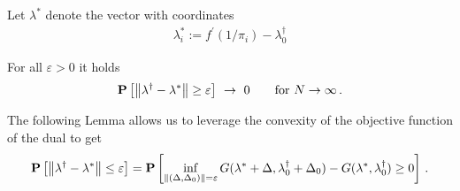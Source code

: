 Let $\lambda^*$ denote the vector with coordinates
\begin{gather}
  \lambda^*_i
  :=
  f^{'}(1/\pi_i)
  -
  \lambda^\dagger_0
\end{gather}

\begin{theorem}
  \label{bw:cd:th}
  For all
  $\varepsilon>0$ it holds
  \begin{gather}
    \P
    \left[ 
    \norm{
      \lambda^\dagger
      -
      \lambda^*
    }
    \ge
    \varepsilon
    \right]
    \ 
    \to
    \ 
    0
    \qquad
    \text{for}\ 
    N
    \to 
    \infty
    \,.
  \end{gather}
\end{theorem}

The following Lemma allows us to leverage the convexity of
the objective function of the dual to get
 \begin{gather*}
   \mathbf{P}
   \left[ 
     \left\lVert
      \lambda ^ \dagger
      -
      \lambda^*
     \right\rVert
     \le
     \varepsilon
   \right]
   =
   \mathbf{P}
   \left[ 
     \inf _ { 
       \left\lVert
         (
     \Delta
     ,
     \Delta_0
         )
 \right\rVert 
= \varepsilon }
     G
     (
     \lambda^*
      +
      \Delta
      ,
      \lambda^\dagger_0
      +
     \Delta_0
     )
     -
     G
     (
     \lambda^*,
      \lambda^\dagger_0
     )
     \ge 
     0
   \right]
   \,.
 \end{gather*}
 

